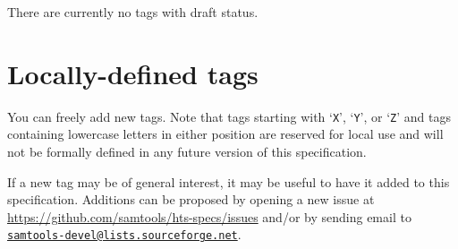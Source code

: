 \documentclass[10pt]{article}
\newcommand{\mailtourl}[1]{\href{mailto:#1}{\tt #1}}
\begin{document}
\vspace*{1em}
There are currently no tags with draft status.



\section{Locally-defined tags}

You can freely add new tags.
Note that tags starting with `{\tt X}', `{\tt Y}', or `{\tt Z}' and tags
containing lowercase letters in either position are reserved for local use
and will not be formally defined in any future version of this specification.

If a new tag may be of general interest, it may be useful to have it added
to this specification.  Additions can be proposed by opening a new issue at
\url{https://github.com/samtools/hts-specs/issues} and/or by sending email
to \mailtourl{samtools-devel@lists.sourceforge.net}.
\end{document}
